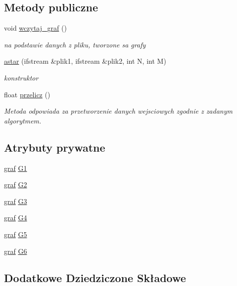 \subsection*{Metody publiczne}
\begin{DoxyCompactItemize}
\item 
void \hyperlink{classastar_a49a57d782d6c8e45d52b8172de9599c3}{wczytaj\-\_\-graf} ()
\begin{DoxyCompactList}\small\item\em na podstawie danych z pliku, tworzone sa grafy \end{DoxyCompactList}\item 
\hyperlink{classastar_a5471c0bcd1ca58c860be5b1c7be30363}{astar} (ifstream \&plik1, ifstream \&plik2, int N, int M)
\begin{DoxyCompactList}\small\item\em konstruktor \end{DoxyCompactList}\item 
float \hyperlink{classastar_a7b105d036382302a04bb2fd7923eb980}{przelicz} ()
\begin{DoxyCompactList}\small\item\em Metoda odpowiada za przetworzenie danych wejsciowych zgodnie z zadanym algorytmem. \end{DoxyCompactList}\end{DoxyCompactItemize}
\subsection*{Atrybuty prywatne}
\begin{DoxyCompactItemize}
\item 
\hyperlink{classgraf}{graf} \hyperlink{classastar_a21539dac3fd18df6e15afc7c83d89427}{G1}
\item 
\hyperlink{classgraf}{graf} \hyperlink{classastar_aa835235b087f6ad57c96c1a7a94d2a62}{G2}
\item 
\hyperlink{classgraf}{graf} \hyperlink{classastar_a06c4202ba38c3eecf189388cf06b9b80}{G3}
\item 
\hyperlink{classgraf}{graf} \hyperlink{classastar_a347408992c953b3208642c68c106b9ac}{G4}
\item 
\hyperlink{classgraf}{graf} \hyperlink{classastar_a55f869eccc405a0f76099e0ecd580eca}{G5}
\item 
\hyperlink{classgraf}{graf} \hyperlink{classastar_a01dac86d8230079b02b217d458aa7bc1}{G6}
\end{DoxyCompactItemize}
\subsection*{Dodatkowe Dziedziczone Składowe}


